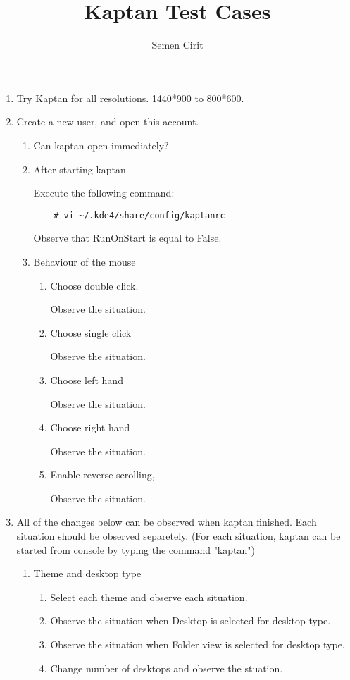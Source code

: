 \documentclass[a4paper,10pt]{article}
\title{Kaptan Test Cases}
\author{Semen Cirit}
\begin{document}
\maketitle

\begin{enumerate}

\item Try Kaptan for all resolutions. 1440*900 to 800*600. 

\item Create a new user, and open this account.
\begin{enumerate}
    \item Can kaptan open immediately?
    \item After starting kaptan

          Execute the following command:
\begin{verbatim}
    # vi ~/.kde4/share/config/kaptanrc
\end{verbatim} 
        Observe that RunOnStart is equal to False.

    \item Behaviour of the mouse
    \begin{enumerate}
        \item Choose double click.

            Observe the situation.
        \item Choose single click

            Observe the situation.

        \item Choose left hand

            Observe the situation.
        \item Choose right hand

            Observe the situation.

        \item Enable reverse scrolling,

            Observe the situation.
    \end{enumerate}
\end{enumerate}

\item All of the changes below can be observed when kaptan finished. Each situation should be observed separetely.
(For each situation, kaptan can be started from console by typing the command "kaptan")
    \begin{enumerate}
    \item Theme and desktop type
        \begin{enumerate}
        \item Select each theme and observe each situation.
        \item Observe the situation when Desktop is selected for desktop type.
        \item Observe the situation when  Folder view is selected for desktop type.
        \item Change number of desktops and observe the stuation.
        \end{enumerate}


\end{enumerate}
\end{enumerate}
\end{document}
